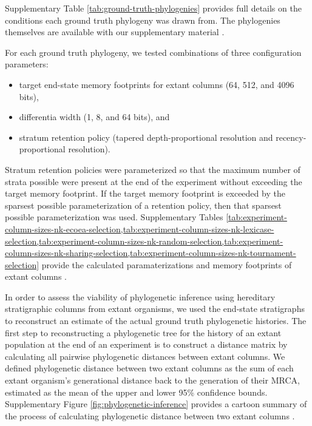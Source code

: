 Supplementary Table \ref{tab:ground-truth-phylogenies} provides full details on the conditions each ground truth phylogeny was drawn from.
The phylogenies themselves are available with our supplementary material \citep{moreno2022hstratconceptsupplement}.

For each ground truth phylogeny, we tested combinations of three configuration parameters:
\begin{itemize}
  \item target end-state memory footprints for extant columns (64, 512, and 4096 bits),
  \item differentia width (1, 8, and 64 bits), and
  \item stratum retention policy (tapered depth-proportional resolution and recency-proportional resolution).
\end{itemize}

Stratum retention policies were parameterized so that the maximum number of strata possible were present at the end of the experiment without exceeding the target memory footprint.
If the target memory footprint is exceeded by the sparsest possible parameterization of a retention policy, then that sparsest possible parameterization was used.
Supplementary Tables \cref{tab:experiment-column-sizes-nk-ecoea-selection,tab:experiment-column-sizes-nk-lexicase-selection,tab:experiment-column-sizes-nk-random-selection,tab:experiment-column-sizes-nk-sharing-selection,tab:experiment-column-sizes-nk-tournament-selection} provide the calculated paramaterizations and memory footprints of extant columns \citep{moreno2022hstratconceptsupplement}.

In order to assess the viability of phylogenetic inference using hereditary stratigraphic columns from extant organisms, we used the end-state stratigraphs to reconstruct an estimate of the actual ground truth phylogenetic histories.
The first step to reconstructing a phylogenetic tree for the history of an extant population at the end of an experiment is to construct a distance matrix by calculating all pairwise phylogenetic distances between extant columns.
We defined phylogenetic distance between two extant columns as the sum of each extant organism's generational distance back to the generation of their MRCA, estimated as the mean of the upper and lower 95\% confidence bounds.
Supplementary Figure \ref{fig:phylogenetic-inference} provides a cartoon summary of the process of calculating phylogenetic distance between two extant columns \citep{moreno2022hstratconceptsupplement}.

